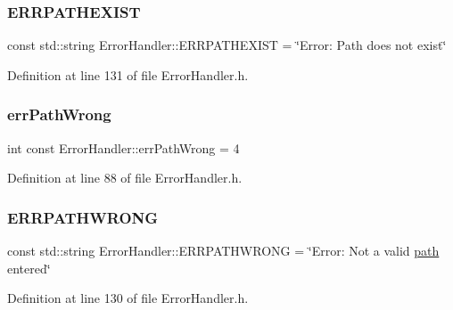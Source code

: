 \subsubsection{\texorpdfstring{ERRPATHEXIST}{ERRPATHEXIST}}
{\footnotesize\ttfamily const std\+::string Error\+Handler\+::\+E\+R\+R\+P\+A\+T\+H\+E\+X\+I\+ST = \char`\"{}Error\+: Path does not exist\char`\"{}\hspace{0.3cm}{\ttfamily [static]}}



Definition at line 131 of file Error\+Handler.\+h.

\mbox{\label{classErrorHandler_aa25a9f5aef3ad844325d5fb3e0fa444d}} 
\subsubsection{\texorpdfstring{errPathWrong}{errPathWrong}}
{\footnotesize\ttfamily int const Error\+Handler\+::err\+Path\+Wrong = 4\hspace{0.3cm}{\ttfamily [static]}}



Definition at line 88 of file Error\+Handler.\+h.

\mbox{\label{classErrorHandler_aaab6de85cae710a56ae6324b06a42179}} 
\subsubsection{\texorpdfstring{ERRPATHWRONG}{ERRPATHWRONG}}
{\footnotesize\ttfamily const std\+::string Error\+Handler\+::\+E\+R\+R\+P\+A\+T\+H\+W\+R\+O\+NG = \char`\"{}Error\+: Not a valid \mbox{\hyperlink{classErrorHandler_aeabbc987b7eaa01b6d006b55b4e00574}{path}} entered\char`\"{}\hspace{0.3cm}{\ttfamily [static]}}



Definition at line 130 of file Error\+Handler.\+h.

\mbox{\label{classErrorHandler_a675f3fcaf9ff86df1e50aae59922f912}} 
